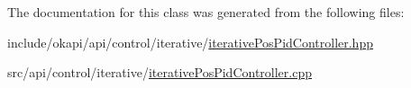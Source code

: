 The documentation for this class was generated from the following files\+:\begin{DoxyCompactItemize}
\item 
include/okapi/api/control/iterative/\mbox{\hyperlink{iterativePosPidController_8hpp}{iterative\+Pos\+Pid\+Controller.\+hpp}}\item 
src/api/control/iterative/\mbox{\hyperlink{iterativePosPidController_8cpp}{iterative\+Pos\+Pid\+Controller.\+cpp}}\end{DoxyCompactItemize}

